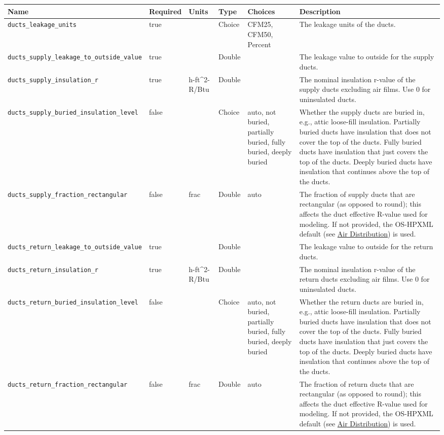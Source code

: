 \begin{longtable}[]{@{}llllll@{}}
\toprule\noalign{}
Name & Required & Units & Type & Choices & Description \\
\midrule\noalign{}
\endhead
\bottomrule\noalign{}
\endlastfoot
\texttt{ducts\_leakage\_units} & true & & Choice & CFM25, CFM50, Percent
& The leakage units of the ducts. \\
\texttt{ducts\_supply\_leakage\_to\_outside\_value} & true & & Double &
& The leakage value to outside for the supply ducts. \\
\texttt{ducts\_supply\_insulation\_r} & true & h-ft\^{}2-R/Btu & Double
& & The nominal insulation r-value of the supply ducts excluding air
films. Use 0 for uninsulated ducts. \\
\texttt{ducts\_supply\_buried\_insulation\_level} & false & & Choice &
auto, not buried, partially buried, fully buried, deeply buried &
Whether the supply ducts are buried in, e.g., attic loose-fill
insulation. Partially buried ducts have insulation that does not cover
the top of the ducts. Fully buried ducts have insulation that just
covers the top of the ducts. Deeply buried ducts have insulation that
continues above the top of the ducts. \\
\texttt{ducts\_supply\_fraction\_rectangular} & false & frac & Double &
auto & The fraction of supply ducts that are rectangular (as opposed to
round); this affects the duct effective R-value used for modeling. If
not provided, the OS-HPXML default (see
\href{https://openstudio-hpxml.readthedocs.io/en/v1.7.0/workflow_inputs.html\#air-distribution}{Air
Distribution}) is used. \\
\texttt{ducts\_return\_leakage\_to\_outside\_value} & true & & Double &
& The leakage value to outside for the return ducts. \\
\texttt{ducts\_return\_insulation\_r} & true & h-ft\^{}2-R/Btu & Double
& & The nominal insulation r-value of the return ducts excluding air
films. Use 0 for uninsulated ducts. \\
\texttt{ducts\_return\_buried\_insulation\_level} & false & & Choice &
auto, not buried, partially buried, fully buried, deeply buried &
Whether the return ducts are buried in, e.g., attic loose-fill
insulation. Partially buried ducts have insulation that does not cover
the top of the ducts. Fully buried ducts have insulation that just
covers the top of the ducts. Deeply buried ducts have insulation that
continues above the top of the ducts. \\
\texttt{ducts\_return\_fraction\_rectangular} & false & frac & Double &
auto & The fraction of return ducts that are rectangular (as opposed to
round); this affects the duct effective R-value used for modeling. If
not provided, the OS-HPXML default (see
\href{https://openstudio-hpxml.readthedocs.io/en/v1.7.0/workflow_inputs.html\#air-distribution}{Air
Distribution}) is used. \\
\end{longtable}

